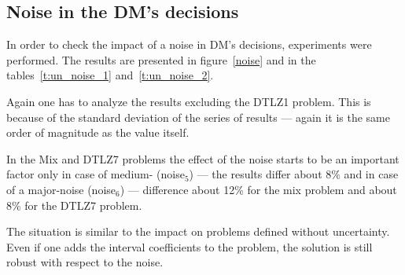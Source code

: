 \clearpage{}

\subsection{Noise in the DM's decisions}
\label{noise-dm2}


In order to check the impact of a noise in DM's decisions, experiments were
performed. The results are presented in figure~\ref{noise} and in the
tables~\ref{t:un_noise_1} and~\ref{t:un_noise_2}.

Again one has to analyze the results excluding the DTLZ1 problem. This is
because of the standard deviation of the series of results --- again it is the
same order of magnitude as the value itself.

In the Mix and DTLZ7 problems the effect of the noise starts to be an
important factor only in case of medium- (noise$_5$) --- the results differ
about $8\%$ and in case of a major-noise (noise$_6$) --- difference about 12\%
for the mix problem and about 8\% for the DTLZ7 problem.

The situation is similar to the impact on problems defined without
uncertainty. Even if one adds the interval coefficients to the problem, the
solution is still robust with respect to the noise.


